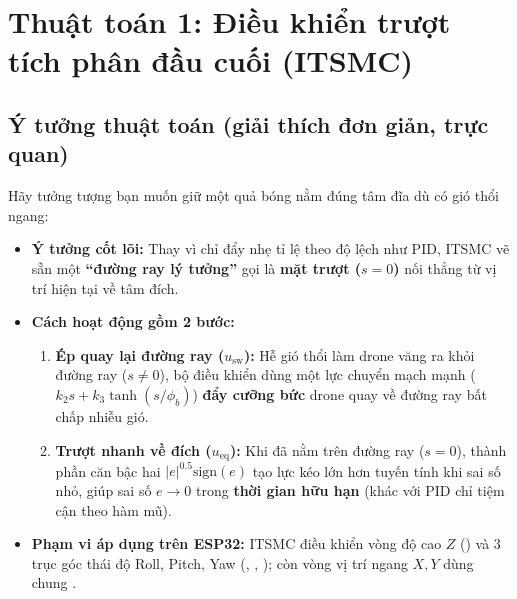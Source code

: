 \documentclass[11pt,a4paper]{article}
\begin{document}
\section{Thuật toán 1: Điều khiển trượt tích phân đầu cuối (ITSMC)}

\subsection{Ý tưởng thuật toán (giải thích đơn giản, trực quan)}
Hãy tưởng tượng bạn muốn giữ một quả bóng nằm đúng tâm đĩa dù có gió thổi ngang:
\begin{itemize}
    \item \textbf{Ý tưởng cốt lõi:} Thay vì chỉ đẩy nhẹ tỉ lệ theo độ lệch như PID, ITSMC vẽ sẵn một \textbf{``đường ray lý tưởng''} gọi là \textbf{mặt trượt ($s = 0$)} nối thẳng từ vị trí hiện tại về tâm đích.
    \item \textbf{Cách hoạt động gồm 2 bước:}
    \begin{enumerate}[leftmargin=1.4em, itemsep=0.2em]
        \item \textbf{Ép quay lại đường ray ($u_{\text{sw}}$):} Hễ gió thổi làm drone văng ra khỏi đường ray ($s \neq 0$), bộ điều khiển dùng một lực chuyển mạch mạnh ($k_2 s + k_3 \tanh(s/\phi_b)$) \textbf{đẩy cưỡng bức} drone quay về đường ray bất chấp nhiễu gió.
        \item \textbf{Trượt nhanh về đích ($u_{\text{eq}}$):} Khi đã nằm trên đường ray ($s = 0$), thành phần căn bậc hai $|e|^{0.5}\text{sign}(e)$ tạo lực kéo lớn hơn tuyến tính khi sai số nhỏ, giúp sai số $e \to 0$ trong \textbf{thời gian hữu hạn} (khác với PID chỉ tiệm cận theo hàm mũ).
    \end{enumerate}
    \item \textbf{Phạm vi áp dụng trên ESP32:} ITSMC điều khiển vòng độ cao $Z$ () và 3 trục góc thái độ Roll, Pitch, Yaw (, , ); còn vòng vị trí ngang $X, Y$ dùng chung .
\end{itemize}
\end{document}
